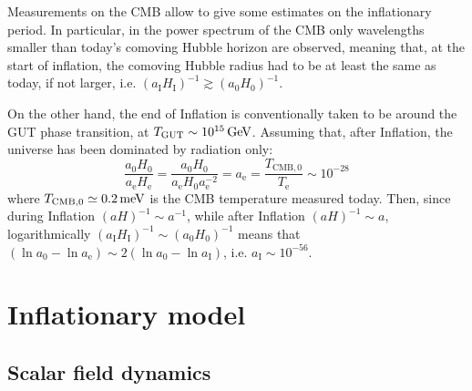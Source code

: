 Measurements on the CMB allow to give some estimates on the inflationary period. In particular, in the power spectrum of the CMB only wavelengths smaller than today's comoving Hubble horizon are observed, meaning that, at the start of inflation, the comoving Hubble radius had to be at least the same as today, if not larger, i.e. $ (a_\text{I} H_\text{I})^{-1} \gtrsim (a_0 H_0)^{-1} $.

On the other hand, the end of Inflation is conventionally taken to be around the GUT phase transition, at $ T_\text{GUT} \sim 10^{15} \,\mathrm{GeV} $. Assuming that, after Inflation, the universe has been dominated by radiation only:
\begin{equation*}
  \frac{a_0 H_0}{a_\text{e} H_\text{e}} = \frac{a_0 H_0}{a_\text{e} H_0 a_\text{e}^{-2}} = a_\text{e} = \frac{T_{\text{CMB},0}}{T_\text{e}} \sim 10^{-28}
\end{equation*}
where $ T_{\text{CMB},0} \simeq 0.2 \,\mathrm{meV} $ is the CMB temperature measured today. Then, since during Inflation $ (aH)^{-1} \sim a^{-1} $, while after Inflation $ (aH)^{-1} \sim a $, logarithmically $ (a_\text{I} H_\text{I})^{-1} \sim (a_0 H_0)^{-1} $ means that $ \left( \ln a_0 - \ln a_\text{e} \right) \sim 2 \left( \ln a_0 - \ln a_\text{I} \right) $, i.e. $ a_\text{I} \sim 10^{-56} $.

\section{Inflationary model}

\subsection{Scalar field dynamics}


